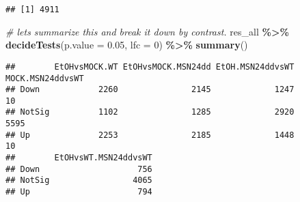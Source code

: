 \documentclass[
]{book}
\newenvironment{Shaded}{\begin{snugshade}}{\end{snugshade}}
\newcommand{\AttributeTok}[1]{\textcolor[rgb]{0.13,0.29,0.53}{#1}}
\newcommand{\CommentTok}[1]{\textcolor[rgb]{0.56,0.35,0.01}{\textit{#1}}}
\newcommand{\DecValTok}[1]{\textcolor[rgb]{0.00,0.00,0.81}{#1}}
\newcommand{\FloatTok}[1]{\textcolor[rgb]{0.00,0.00,0.81}{#1}}
\newcommand{\FunctionTok}[1]{\textcolor[rgb]{0.13,0.29,0.53}{\textbf{#1}}}
\newcommand{\NormalTok}[1]{#1}
\newcommand{\SpecialCharTok}[1]{\textcolor[rgb]{0.81,0.36,0.00}{\textbf{#1}}}
\begin{document}
\begin{Shaded}
\end{Shaded}

\begin{verbatim}
## [1] 4911
\end{verbatim}

\begin{Shaded}
\begin{Highlighting}[]
\CommentTok{\# let\textquotesingle{}s summarize this and break it down by contrast.}
\NormalTok{res\_all }\SpecialCharTok{\%\textgreater{}\%}
  \FunctionTok{decideTests}\NormalTok{(}\AttributeTok{p.value =} \FloatTok{0.05}\NormalTok{, }\AttributeTok{lfc =} \DecValTok{0}\NormalTok{) }\SpecialCharTok{\%\textgreater{}\%}
  \FunctionTok{summary}\NormalTok{()}
\end{Highlighting}
\end{Shaded}

\begin{verbatim}
##        EtOHvsMOCK.WT EtOHvsMOCK.MSN24dd EtOH.MSN24ddvsWT MOCK.MSN24ddvsWT
## Down            2260               2145             1247               10
## NotSig          1102               1285             2920             5595
## Up              2253               2185             1448               10
##        EtOHvsWT.MSN24ddvsWT
## Down                    756
## NotSig                 4065
## Up                      794
\end{verbatim}
\end{document}
